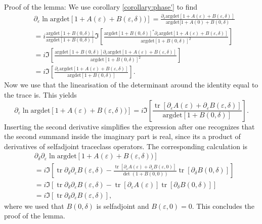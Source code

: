 \documentclass[oneside,reqno,12pt]{amsart}
\DeclareMathOperator{\tr}{tr}
\begin{document}
Proof of the lemma: We use corollary \ref{corollary:phase'} to find
\begin{align*}
&\partial_\varepsilon \ln \text{argdet}\left[ 1 + A(\varepsilon) + B(\varepsilon,\delta))\right] 
= \frac{\partial_\varepsilon \text{argdet}[1+A(\varepsilon) + B(\varepsilon,\delta)]}{\text{argdet}[1+A(0)+B(0,\delta)}\\
&=i \frac{\text{argdet}[1+B(0,\delta)]}{\text{argdet}[1+B(0,\delta)]} \Im \left[ \frac{\text{argdet}[1+B(0,\delta)]^* \partial_\varepsilon \text{argdet}[1+A(\varepsilon)+B(\varepsilon,\delta)]}{\text{argdet}[1+B(0,\delta)]^2}\right]\\
&=i \Im \left[ \frac{\text{argdet}[1+B(0,\delta)] \partial_\varepsilon \text{argdet}[1+A(\varepsilon)+B(\varepsilon,\delta)]}{\text{argdet}[1+B(0,\delta)]^2}\right]\\
&=i \Im \left[ \frac{\partial_\varepsilon \text{argdet}[1+A(\varepsilon)+B(\varepsilon,\delta)]}{\text{argdet}[1+B(0,\delta)]}\right].
\end{align*}
Now we use that the linearisation of the determinant around the identity equal to the trace is. This yields
\begin{equation}
\partial_\varepsilon \ln \text{argdet}\left[ 1 + A(\varepsilon) + B(\varepsilon,\delta))\right] 
=i \Im \left[ \frac{ \tr [\partial_\varepsilon A(\varepsilon)+\partial_\varepsilon B(\varepsilon,\delta)]}{\text{argdet}[1+B(0,\delta)]}\right].
\end{equation}
Inserting the second derivative simplifies the expression after one recognizes that the second summand inside the imaginary part is real, since its a product of derivatives of selfadjoint traceclass operators. The corresponding calculation is
\begin{align*}
&\partial_{\delta} \partial_{\varepsilon} \ln \text{argdet}\left[ 1 + A(\varepsilon) + B(\varepsilon,\delta))\right] \\
&=i \Im \left[ \tr \partial_{\delta}\partial_{\varepsilon} B(\varepsilon,\delta) - \frac{\tr[\partial_{\varepsilon}A(\varepsilon) + \partial_{\varepsilon} B(\varepsilon,0)]}{\det(1+B(0,0))} \tr[\partial_{\delta} B(0,\delta)]\right]\\
&=i \Im \left[ \tr \partial_{\delta}\partial_{\varepsilon} B(\varepsilon,\delta) - \tr[\partial_{\varepsilon}A(\varepsilon)] \tr[\partial_{\delta} B(0,\delta)]\right]\\
&=i \Im \left[ \tr \partial_{\delta}\partial_{\varepsilon} B(\varepsilon,\delta) \right],
\end{align*}
where we used that \(B(0,\delta)\) is selfadjoint and \(B(\varepsilon,0)=0\). This concludes the proof of the lemma.
\end{document}
